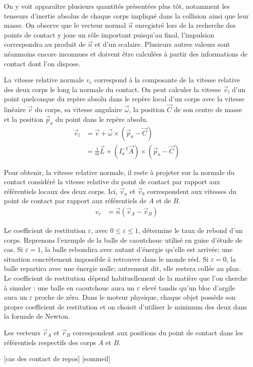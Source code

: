 On y voit apparaître plusieurs quantités présentées plus tôt,
notamment les tenseurs d'inertie absolus de chaque corps impliqué dans
la collision ainsi que leur masse. On observe que le vecteur normal
$\vec{n}$ enregistré lors de la recherche des points de contact y joue
un rôle important puisqu'au final, l'impulsion correspondra au produit
de $\vec{n}$ et d'un scalaire. Plusieurs autres valeurs sont néanmoins
encore inconnues et doivent être calculées à partir des informations
de contact dont l'on dispose.

La vitesse relative normale $v_r$ correspond à la composante de la
vitesse relative des deux corps le long la normale du contact. On peut
calculer la vitesse $\vec{v}_l$ d'un point quelconque du repère absolu
dans le repère local d'un corps avec la vitesse linéaire $\vec{v}$ du
corps, sa vitesse angulaire $\vec{\omega}$, la position $\vec{C}$ de
son centre de masse et la position $\vec{p}_a$ du point dans le repère
absolu.
\begin{align*}
  \vec{v}_l &= \vec{v} + \vec{\omega} \times (\vec{p}_a - \vec{C}) \\
            &= \frac{1}{m} \vec{L} + (I^{-1}_a \vec{A}) \times (\vec{p}_a - \vec{C})
\end{align*}

Pour obtenir, la vitesse relative normale, il reste à projeter sur la
normale du contact considéré la vitesse relative du point de contact
par rapport aux référentiels locaux des deux corps. Ici, $\vec{v}_a$
et $\vec{v}_b$ correspondent aux vitesses du point de contact par
rapport aux référentiels de $A$ et de $B$.
\begin{align*}
  v_r &= \vec{n} (\vec{v}_{A} - \vec{v}_{B})
\end{align*}

Le coefficient de restitution $\varepsilon$, avec $0 \leq \varepsilon
\leq 1$, détermine le taux de rebond d'un corps. Reprenons l'exemple
de la balle de caoutchouc utilisé en guise d'étude de cas. Si
$\varepsilon = 1$, la balle rebondira avec autant d'énergie qu'elle
est arrivée; une situation concrètement impossible à retrouver dans le
monde réel. Si $\varepsilon = 0$, la balle repartira avec une énergie
nulle; autrement dit, elle restera collée au plan. Le coefficient de
restitution dépend habituellement de la matière que l'on cherche à
simuler : une balle en caoutchouc aura un $\varepsilon$ elevé tandis
qu'un bloc d'argile aura un $\varepsilon$ proche de zéro. Dans le
moteur physique, chaque objet possède son propre coefficient de
restitution et on choisit d'utiliser le minimum des deux dans la
formule de Newton.

Les vecteurs $\vec{r}_A$ et $\vec{r}_B$ correspondent aux positions du
point de contact dans les référentiels respectifs des corps $A$ et $B$.

[cas des contact de repos]
[sommeil]
